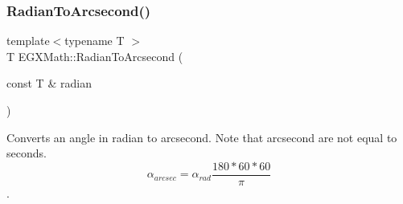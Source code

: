 \mbox{\label{group___e_g_x_math-_angle_conversions-_radian_ga2f952f6675a0fc54bf72bfe4e3d2664a}} 
\subsubsection{\texorpdfstring{Radian\+To\+Arcsecond()}{RadianToArcsecond()}}
{\footnotesize\ttfamily template$<$typename T $>$ \\
T E\+G\+X\+Math\+::\+Radian\+To\+Arcsecond (\begin{DoxyParamCaption}\item[{const T \&}]{radian }\end{DoxyParamCaption})}



Converts an angle in radian to arcsecond. Note that arcsecond are not equal to seconds. \[\alpha_{arcsec}=\alpha_{rad}\frac{180 * 60 * 60}{\pi}\]. 

